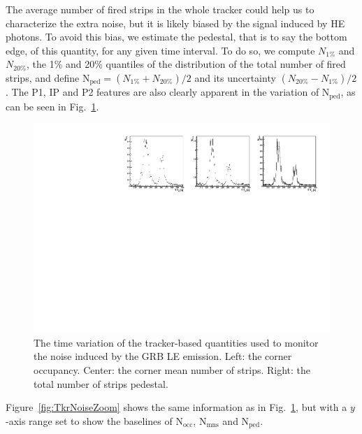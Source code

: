 \documentclass[preprint]{aastex631}
\begin{document}
The average number of fired strips in the whole tracker could help us to characterize the extra noise, but it is likely biased by the signal induced by HE photons. To avoid this bias, we estimate the pedestal, that is to say the bottom edge, of this quantity, for any given time interval. To do so, we compute $N_{1\%}$ and $N_{20\%}$, the 1\% and 20\% quantiles of the distribution of the total number of fired strips, and define $\mathrm{N}_\mathrm{ped} = (N_{1\%}+N_{20\%})/2$ and its uncertainty $(N_{20\%}-N_{1\%})/2$. The P1, IP and P2 features are also clearly apparent in the variation of $\mathrm{N}_\mathrm{ped}$, as can be seen in Fig.~\ref{fig:TkrNoise}.

\begin{figure}[t]
    \centering
    \includegraphics[width=0.9\linewidth]{paper_showcheckTkrNoiseInCorner.pdf}
    \caption{The time variation of the tracker-based quantities used to monitor the noise induced by the GRB LE emission. Left: the corner occupancy. Center: the corner mean number of strips. Right: the total number of strips pedestal. }
    \label{fig:TkrNoise}
\end{figure}

Figure~\ref{fig:TkrNoiseZoom} shows the same information as in Fig.~\ref{fig:TkrNoise}, but with a $y$-axis range set to show the baselines of $\mathrm{N}_\mathrm{occ}$, $\mathrm{N}_\mathrm{mns}$ and $\mathrm{N}_\mathrm{ped}$.
\end{document}
